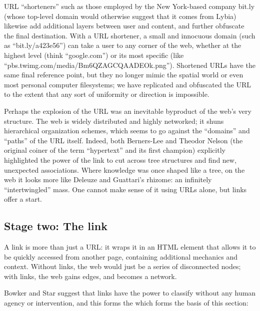 URL ``shorteners'' such as those employed by the New York-based company bit.ly (whose top-level domain would otherwise suggest that it comes from Lybia) likewise add additional layers between user and content, and further obfuscate the final destination. With a URL shortener, a small and innocuous domain (such as ``bit.ly/a423e56'') can take a user to any corner of the web, whether at the highest level (think ``google.com'') or its most specific (like ``pbs.twimg.com/media/Bm6QZAGCQAADEOk.png''). Shortened URLs have the same final reference point, but they no longer mimic the spatial world or even most personal computer filesystems; we have replicated and obfuscated the URL to the extent that any sort of uniformity or direction is impossible.\autocite{helmond}


Perhaps the explosion of the URL was an inevitable byproduct of the web's very structure. The web is widely distributed and highly networked; it shuns hierarchical organization schemes, which seems to go against the ``domains'' and ``paths'' of the URL itself. Indeed, both Berners-Lee and Theodor Nelson (the original coiner of the term ``hypertext'' and its first champion) explicitly highlighted the power of the link to cut across tree structures and find new, unexpected associations.\autocite{berners-lee, nelson} Where knowledge was once shaped like a tree, on the web it looks more like Deleuze and Guattari's rhizome: an infinitely ``intertwingled'' mass.\autocite{deleuze, nelson. figure here too?} One cannot make sense of it using URLs alone, but links offer a start.

\subsection{Stage two: The link}

A link is more than just a URL: it wraps it in an HTML element that allows it to be quickly accessed from another page, containing additional mechanics and context. Without links, the web would just be a series of disconnected nodes; with links, the web gains edges, and becomes a network.\autocite{figure here of nodes and then network} 


Bowker and Star suggest that links have the power to classify without any human agency or intervention, and this forms the which forms the basis of this section: 

